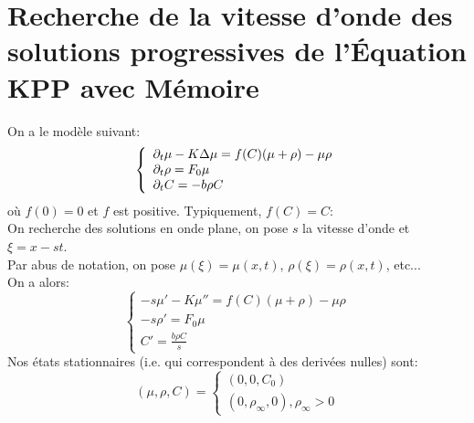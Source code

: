 \documentclass[11pt]{article}
\begin{document}
\fi

\section{Recherche de la vitesse d'onde des solutions progressives de l’Équation KPP avec Mémoire}
On a le modèle suivant: 
\begin{equation} \label{eq:FWSMem} \left\{
                \begin{array}{ll}
                   \partial_t\mu -K\Delta\mu = f(C)(\mu + \rho) -\mu\rho\\
                 \partial_t\rho=  F_0 \mu \\
                  \partial_t C = -b\rho C
                \end{array}
              \right.
\end{equation} 
où $f(0)=0$ et $f$ est positive. Typiquement, $f(C)=C$:\\
On recherche des solutions en onde plane, on pose $s$ la vitesse d'onde et $\xi = x - st$. \\
Par abus de notation, on pose $\mu(\xi)=\mu(x,t)$, $\rho(\xi)=\rho(x,t)$, etc... \\
On a alors:
\begin{equation} \left\{ \begin{array}{ll} -s \mu'-K\mu''=f(C)(\mu+\rho)-\mu\rho \\ -s\rho' = F_0\mu  \\C'=\frac{b\rho C}{s} \end{array}\right.
\end{equation}
Nos états stationnaires (i.e. qui correspondent à des derivées nulles) sont: \begin{equation}
	(\mu,\rho,C) = \left\{ \begin{array}{ll} (0,0,C_0) \\
 (0,\rho_\infty,0) , \rho_\infty > 0 \end{array} \right.
\end{equation}
\end{document}
